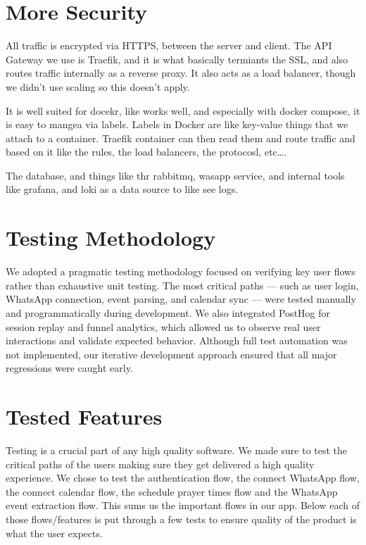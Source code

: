 \section{More Security}

All traffic is encrypted via HTTPS, between the server and client. The API Gateway we use is Traefik, and it is what basically termiants the SSL, and also routes traffic internally as a reverse proxy. It also acts as a load balancer, though we didn't use scaling so this doesn't apply.

It is well suited for docekr, like works well, and especially with docker compose, it is easy to mangea via labels. Labels in Docker are like key-value things that we attach to a container. Traefik container can then read them and route traffic and based on it like the rules, the load balancers, the protocosl, etc\dots.

The database, and things like thr rabbitmq, wasapp service, and internal tools like grafana, and loki as a data source to like see logs.

\section{Testing Methodology}

We adopted a pragmatic testing methodology focused on verifying key user flows rather than exhaustive unit testing. The most critical paths — such as user login, WhatsApp connection, event parsing, and calendar sync — were tested manually and programmatically during development. We also integrated PostHog for session replay and funnel analytics, which allowed us to observe real user interactions and validate expected behavior. Although full test automation was not implemented, our iterative development approach ensured that all major regressions were caught early.

\section{Tested Features}

Testing is a crucial part of any high quality software. We made sure to test the critical paths of the users making sure they get delivered a high quality experience. We chose to test the authentication flow, the connect WhatsApp flow, the connect calendar flow, the schedule prayer times flow and the WhatsApp event extraction flow. This sums us the important flows in our app. Below each of those flows/features is put through a few tests to ensure quality of the product is what the user expects.

